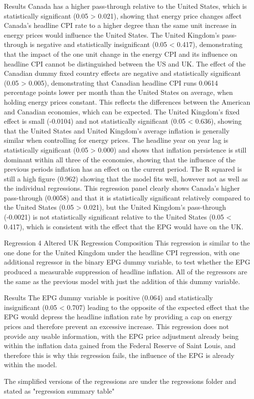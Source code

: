 Results
Canada has a higher pass-through relative to the United States, which is statistically significant (0.05 > 0.021), showing that energy price changes affect Canada's headline CPI rate to a higher degree than the same unit increase in energy prices would influence the United States. The United Kingdom's pass-through is negative and statistically insignificant (0.05 < 0.417), demonstrating that the impact of the one unit change in the energy CPI and its influence on headline CPI cannot be distinguished between the US and UK.
The effect of the Canadian dummy fixed country effects are negative and statistically significant (0.05 > 0.005), demonstrating that Canadian headline CPI runs 0.0614 percentage points lower per month than the United States on average, when holding energy prices constant. This reflects the differences between the American and Canadian economies, which can be expected.
The United Kingdom's fixed effect is small (-0.0104) and not statistically significant (0.05 < 0.636), showing that the United States and United Kingdom's average inflation is generally similar when controlling for energy prices.
The headline year on year lag is statistically significant (0.05 > 0.000) and shows that inflation persistence is still dominant within all three of the economies, showing that the influence of the previous periods inflation has an effect on the current period.
The R squared is still a high figure (0.962) showing that the model fits well, however not as well as the individual regressions. 
This regression panel clearly shows Canada's higher pass-through (0.0058) and that it is statistically significant relatively compared to the United States (0.05 > 0.021), but the United Kingdom's pass-through (-0.0021) is not statistically significant relative to the United States (0.05 < 0.417), which is consistent with the effect that the EPG would have on the UK.


Regression 4 Altered UK
Regression Composition
This regression is similar to the one done for the United Kingdom under the headline CPI regression, with one additional regressor in the binary EPG dummy variable, to test whether the EPG produced a measurable suppression of headline inflation.
All of the regressors are the same as the previous model with just the addition of this dummy variable.

Results
The EPG dummy variable is positive (0.064) and statistically insignificant (0.05 < 0.707) leading to the opposite of the expected effect that the EPG would depress the headline inflation rate by providing a cap on energy prices and therefore prevent an excessive increase. This regression does not provide any usable information, with the EPG price adjustment already being within the inflation data gained from the Federal Reserve of Saint Louis, and therefore this is why this regression fails, the influence of the EPG is already within the model.

The simplified versions of the regressions are under the regressions folder and stated as "regression summary table"